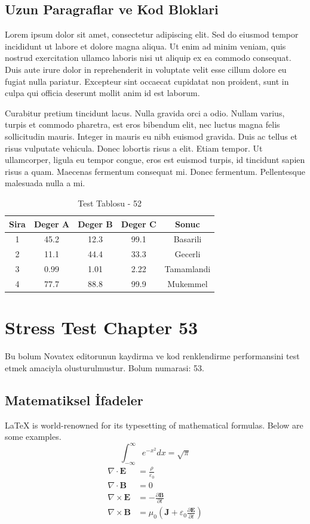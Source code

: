 \documentclass[12pt,a4paper]{article}
\begin{document}
\subsection{Uzun Paragraflar ve Kod Bloklari}
Lorem ipsum dolor sit amet, consectetur adipiscing elit. Sed do eiusmod tempor incididunt ut labore et dolore magna aliqua. Ut enim ad minim veniam, quis nostrud exercitation ullamco laboris nisi ut aliquip ex ea commodo consequat. Duis aute irure dolor in reprehenderit in voluptate velit esse cillum dolore eu fugiat nulla pariatur. Excepteur sint occaecat cupidatat non proident, sunt in culpa qui officia deserunt mollit anim id est laborum.

Curabitur pretium tincidunt lacus. Nulla gravida orci a odio. Nullam varius, turpis et commodo pharetra, est eros bibendum elit, nec luctus magna felis sollicitudin mauris. Integer in mauris eu nibh euismod gravida. Duis ac tellus et risus vulputate vehicula. Donec lobortis risus a elit. Etiam tempor. Ut ullamcorper, ligula eu tempor congue, eros est euismod turpis, id tincidunt sapien risus a quam. Maecenas fermentum consequat mi. Donec fermentum. Pellentesque malesuada nulla a mi.

\begin{table}[h!]
\centering
\begin{tabular}{|c|c|c|c|c|}
\hline
\textbf{Sira} & \textbf{Deger A} & \textbf{Deger B} & \textbf{Deger C} & \textbf{Sonuc} \\
\hline
1 & 45.2 & 12.3 & 99.1 & Basarili \\
2 & 11.1 & 44.4 & 33.3 & Gecerli \\
3 & 0.99 & 1.01 & 2.22 & Tamamlandi \\
4 & 77.7 & 88.8 & 99.9 & Mukemmel \\
\hline
\end{tabular}
\caption{Test Tablosu - 52}
\end{table}

\newpage
\section{Stress Test Chapter 53}
Bu bolum Novatex editorunun kaydirma ve kod renklendirme performansini test etmek amaciyla olusturulmustur. Bolum numarasi: 53.

\subsection{Matematiksel İfadeler}
\LaTeX{} is world-renowned for its typesetting of mathematical formulas. Below are some examples.
\begin{equation}
\int_{-\infty}^{\infty} e^{-x^2} dx = \sqrt{\pi}
\end{equation}
\begin{align}
\nabla \cdot \mathbf{E} &= \frac{\rho}{\varepsilon_0} \\
\nabla \cdot \mathbf{B} &= 0 \\
\nabla \times \mathbf{E} &= -\frac{\partial \mathbf{B}}{\partial t} \\
\nabla \times \mathbf{B} &= \mu_0\left(\mathbf{J} + \varepsilon_0 \frac{\partial \mathbf{E}}{\partial t}\right)
\end{align}
\end{document}
